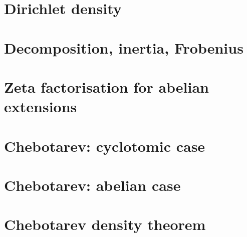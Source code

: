 \begin{abstract}
\begin{enumerate}
\item \emph{General case} (\cref{ch:main}). The conjugacy-class form is
reduced to the cyclic-extension case via the intermediate field
$E=L^{\ang\sigma}$: the counting "exactly $\abs{G}/(f\abs{C})$ primes of
$L$ above $\fp$ have Frobenius $\sigma$" yields the density relation
$\delta_K(S) = (f\abs{C}/\abs{G})\delta_E(T_\sigma)$, which combines
with the abelian case for $L/E$.
\end{enumerate}

The proof needs no class field theory; it is essentially Chebotarev's
original strategy as expounded by Stevenhagen--Lenstra.
\end{abstract}

\clearpage
\setcounter{page}{2}
\tableofcontents

\blueprintmainmatter
\chapter{Dirichlet density}\label{ch:density}


\pagebreak
\chapter{Decomposition, inertia, Frobenius}\label{ch:frobenius}


\pagebreak
\chapter{Zeta factorisation for abelian extensions}\label{ch:zeta-product}


\pagebreak
\chapter{Chebotarev: cyclotomic case}\label{ch:cyclotomic}


\pagebreak
\chapter{Chebotarev: abelian case}\label{ch:abelian}


\pagebreak
\chapter{Chebotarev density theorem}\label{ch:main}

